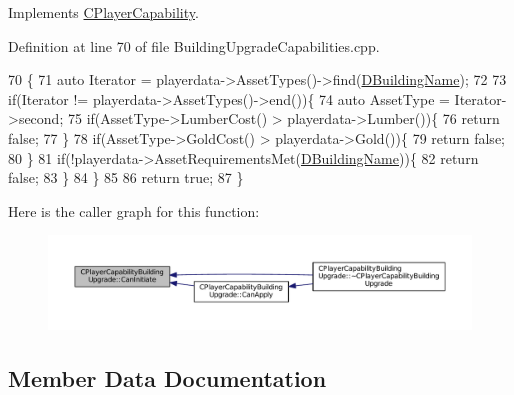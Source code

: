 Implements \hyperlink{classCPlayerCapability_aa83b1e1fcaff2985c378132d679154ea}{C\+Player\+Capability}.



Definition at line 70 of file Building\+Upgrade\+Capabilities.\+cpp.


\begin{DoxyCode}
70                                                                                                            
                         \{
71     \textcolor{keyword}{auto} Iterator = playerdata->AssetTypes()->find(\hyperlink{classCPlayerCapabilityBuildingUpgrade_a244e767a3e669441cfb03c13bf703e64}{DBuildingName});
72     
73     \textcolor{keywordflow}{if}(Iterator != playerdata->AssetTypes()->end())\{
74         \textcolor{keyword}{auto} AssetType = Iterator->second;
75         \textcolor{keywordflow}{if}(AssetType->LumberCost() > playerdata->Lumber())\{
76             \textcolor{keywordflow}{return} \textcolor{keyword}{false};   
77         \}
78         \textcolor{keywordflow}{if}(AssetType->GoldCost() > playerdata->Gold())\{
79             \textcolor{keywordflow}{return} \textcolor{keyword}{false};   
80         \}
81         \textcolor{keywordflow}{if}(!playerdata->AssetRequirementsMet(\hyperlink{classCPlayerCapabilityBuildingUpgrade_a244e767a3e669441cfb03c13bf703e64}{DBuildingName}))\{
82             \textcolor{keywordflow}{return} \textcolor{keyword}{false};
83         \}
84     \}
85     
86     \textcolor{keywordflow}{return} \textcolor{keyword}{true};
87 \}
\end{DoxyCode}
Here is the caller graph for this function\+:\nopagebreak
\begin{figure}[H]
\begin{center}
\leavevmode
\includegraphics[width=350pt]{classCPlayerCapabilityBuildingUpgrade_af515cec6f1a28607864c853307e17d7c_icgraph}
\end{center}
\end{figure}


\subsection{Member Data Documentation}
\hypertarget{classCPlayerCapabilityBuildingUpgrade_a244e767a3e669441cfb03c13bf703e64}{}\label{classCPlayerCapabilityBuildingUpgrade_a244e767a3e669441cfb03c13bf703e64} 
